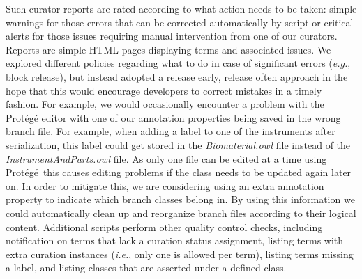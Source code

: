 \documentclass{elsart}       %
\begin{document}


Such curator reports are rated according to what action needs to be taken: simple warnings for those errors that can be corrected automatically by script or critical alerts for those issues requiring manual intervention from one of our curators. Reports are simple HTML pages displaying terms and associated issues.
We explored different policies regarding what to do in case of significant errors (\emph{e.g.}, block release), but instead adopted a release early, release often approach in the hope that this would encourage developers to correct mistakes in a timely fashion.
For example, we would occasionally encounter a problem with the Prot\'eg\'e\cite{protege} editor with one of our annotation properties being saved in the wrong branch file. For example, when adding a label to one of the instruments after serialization, this label could get stored in the \emph{Biomaterial.owl} file instead of the \emph{InstrumentAndParts.owl} file. %
As only one file can be edited at a time using Prot\'eg\'e\, this causes editing problems if the class needs to be updated again later on.
In order to mitigate this, we are considering using an extra annotation property to indicate which branch classes belong in.
By using this information we could automatically clean up and reorganize branch files according to their logical content.
Additional scripts perform other quality control checks, including notification on terms that lack a curation status assignment, listing terms with extra curation instances (\emph{i.e.}, only one is allowed per term), listing terms missing a label, and listing classes that are asserted under a defined class.

\end{document}
